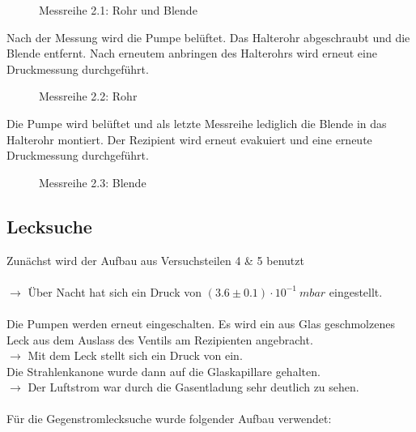 \documentclass[12pt, a4paper]{scrartcl}
\begin{document}
    	\begin{figure}[H]
    		\centering
    		\caption{Messreihe 2.1: Rohr und Blende}
   		\end{figure}
   	
   		Nach der Messung wird die Pumpe belüftet. Das Halterohr abgeschraubt und die Blende entfernt. Nach erneutem anbringen des Halterohrs wird erneut eine Druckmessung durchgeführt.
   	
   		\begin{figure}[H]
   			\centering
   			\caption{Messreihe 2.2: Rohr}
   		\end{figure}
   	
   		Die Pumpe wird belüftet und als letzte Messreihe lediglich die Blende in das Halterohr montiert. Der Rezipient wird erneut evakuiert und eine erneute Druckmessung durchgeführt.
   	
   		\begin{figure}[H]
   			\centering
   			\caption{Messreihe 2.3: Blende}
   		\end{figure}    
    
    
    \subsection{Lecksuche}
    
		Zunächst wird der Aufbau aus Versuchsteilen 4 \& 5 benutzt\\\\	
		$\rightarrow$ Über Nacht hat sich ein Druck von 
        $(3.6\pm0.1)\cdot 10^{-1}\ mbar$
        eingestellt.\\\\
		Die Pumpen werden erneut eingeschalten. Es wird ein aus Glas geschmolzenes Leck aus dem Auslass des Ventils am Rezipienten angebracht.\\
		$\rightarrow$ Mit dem Leck stellt sich ein Druck von 
        ein.\\		
		Die Strahlenkanone wurde dann auf die Glaskapillare gehalten.\\
		$\rightarrow$ Der Luftstrom war durch die Gasentladung sehr deutlich zu sehen.\\\\		
		Für die Gegenstromlecksuche wurde folgender Aufbau verwendet:
		
\end{document}
